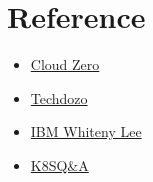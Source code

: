 \documentclass{article}
\begin{document}

\section{Reference}
\begin{itemize}
    \item \href{https://www.cloudzero.com/blog/kubernetes-node-vs-pod/}{Cloud Zero}
    \item \href{https://techdozo.dev/kubernetes-architecture/}{Techdozo}
    \item \href{https://www.youtube.com/watch?v=OmphHSaO1sE}{IBM Whiteny Lee}
    \item \href{https://www.fullstack.cafe/blog/kubernetes-interview-questions}{K8SQ\&A}
\end{itemize}
\end{document}
